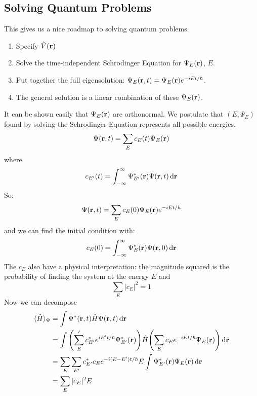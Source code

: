 \subsection{Solving Quantum Problems}
This gives us a nice roadmap to solving quantum problems.
\begin{enumerate}
    \item Specify $\hat{V}(\mathbf{r})$
    \item Solve the time-independent Schrodinger Equation for $\Psi_E(\mathbf{r})$, $E$.
    \item Put together the full eigensolution: $\Psi_E(\mathbf{r}, t) = \Psi_E(\mathbf{r}) e^{-iEt/\hbar}$.
    \item The general solution is a linear combination of these $\Psi_E(\mathbf{r})$.
\end{enumerate}
It can be shown easily that $\Psi_E(\mathbf{r})$ are orthonormal.
We postulate that $(E, \Psi_E)$ found by solving the Schrodinger Equation represents all possible energies.
\[ \Psi(\mathbf{r}, t) = \sum_{E} c_E(t) \Psi_E(\mathbf{r}) \]
where 
\[ c_{E'}(t) = \int_{-\infty}^{\infty} \Psi_{E'}^*(\mathbf{r}) \Psi(\mathbf{r}, t) \dd{\mathbf{r}} \]
So:
\[ \Psi(\mathbf{r}, t) = \sum_{E} c_E(0) \Psi_E(\mathbf{r}) e^{-iEt/\hbar} \]
and we can find the initial condition with:
\[ c_{E}(0) = \int_{-\infty}^{\infty} \Psi_{E}^*(\mathbf{r}) \Psi(\mathbf{r}, 0) \dd{\mathbf{r}} \]
The $c_{E}$ also have a physical interpretation: the magnitude squared is the probability of finding the system at the energy $E$ and
\[ \sum_{E} |c_E|^2 = 1 \]
Now we can decompose 
\begin{align*}
    \langle \hat{H} \rangle_{\Psi} &= \int \Psi^*(\mathbf{r}, t) \hat{H} \Psi(\mathbf{r}, t) \dd{\mathbf{r}} \\
    &= \int \qty(\sum_E' c^*_{E'} e^{iE't/\hbar} \Psi^*_{E'}(\mathbf{r})) \hat{H} \qty(\sum_E c_E e^{-iEt/\hbar} \Psi_E(\mathbf{r}))  \dd{\mathbf{r}} \\
    &= \sum_E \sum_{E'} c^*_{E'} c_E e^{-i(E - E')t/\hbar} E \int \Psi^*_{E'}(\mathbf{r}) \Psi_E(\mathbf{r}) \dd{\mathbf{r}} \\
    &= \sum_E |c_E|^2 E
\end{align*}